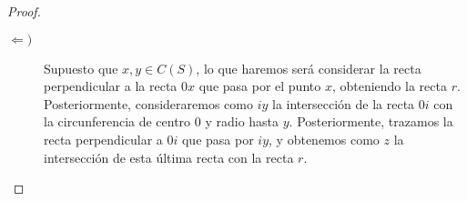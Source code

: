 \begin{lema}
\begin{proof}
\begin{description}
\begin{itemize}
\begin{figure}[H]
                        \end{figure}
                \end{itemize}
            \item [$\Longleftarrow )$] Supuesto que $x,y\in C(S)$, lo que haremos será considerar la recta perpendicular a la recta $0x$ que pasa por el punto $x$, obteniendo la recta $r$. Posteriormente, consideraremos como $iy$ la intersección de la recta $0i$ con la circunferencia de centro $0$ y radio hasta $y$. Posteriormente, trazamos la recta perpendicular a $0i$ que pasa por $iy$, y obtenemos como $z$ la intersección de esta última recta con la recta $r$.
                \begin{figure}[H]
                    \centering
                \end{figure}
        \end{description}
    \end{proof}
\end{lema}

